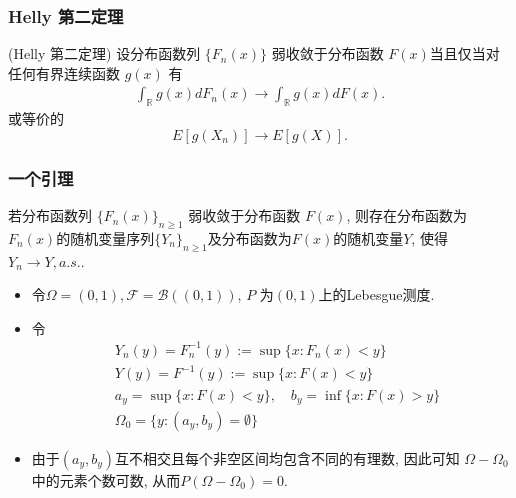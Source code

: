 \documentclass[Prob-All.tex]{subfiles}
\begin{document}
\begin{frame}
	\frametitle{{\rm Helly} 第二定理}
	\begin{thm}
		({\rm Helly} 第二定理) 设分布函数列 $\{F_n(x)\}$ 弱收敛于分布函数 $F (x)$当且仅当对任何有界连续函数 $g(x)$ 有
		\begin{eqnarray*}
			\int_{\mathbb{R}}g(x)dF_n(x)\rightarrow\int_{\mathbb{R}}g(x)dF(x).
		\end{eqnarray*}
		或等价的\pause
		\[E[g(X_n)]\rightarrow E[g(X)].\]
	\end{thm}

\end{frame}

\begin{frame}
	\frametitle{一个引理}
	\begin{thm}
		若分布函数列 $\{F_n(x)\}_{n\geq 1}$ 弱收敛于分布函数 $F (x)$, 则存在分布函数为$F_n(x)$的随机变量序列$\{Y_n\}_{n\geq 1}$及分布函数为$F(x)$的随机变量$Y$, 使得$Y_n\rightarrow Y, a.s.$.
	\end{thm}\pause

	\zheng %
		\begin{itemize}[<+-|alert@+>]
		\item 令$\Omega=(0,1), \mathcal{F}=\mathcal{B}((0,1))$, $P$ 为$(0,1)$上的Lebesgue测度.
		\item 令
		\begin{align*}
			&Y_{n}(y)=F_n^{-1}(y):=\sup \{x: F_{n}(x)<y\}\\
			&Y(y)=F^{-1}(y):=\sup \{x: F(x)<y\}\\
			&a_{y}=\sup \{x: F(x)<y\}, \quad b_{y}=\inf \{x: F(x)>y\}\\
			&\Omega_0=\{y:\left(a_{y}, b_{y}\right)=\emptyset\}
		\end{align*}
		 \item  由于$\left(a_{y}, b_{y}\right)$互不相交且每个非空区间均包含不同的有理数, 因此可知 $\Omega-\Omega_0$ 中的元素个数可数, 从而$P(\Omega-\Omega_0)=0$.

		\end{itemize}


\end{frame}
\end{document}

